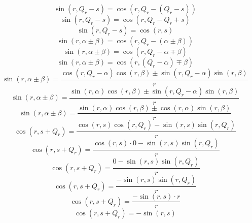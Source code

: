 \documentclass[a4paper,12pt]{report}
\begin{document}
\begin{equation}
\sin(r,Q_r - s) = \cos(r,Q_r - (Q_r - s))
\end{equation}
\begin{equation}
\sin(r,Q_r - s) = \cos(r,Q_r - Q_r + s)
\end{equation}
\begin{equation}
\sin(r,Q_r - s) = \cos(r,s)
\end{equation}
\begin{equation}
\sin(r,\alpha \pm \beta) = \cos(r,Q_r - (\alpha \pm \beta))
\end{equation}
\begin{equation}
\sin(r,\alpha \pm \beta) = \cos(r,Q_r - \alpha \mp \beta)
\end{equation}
\begin{equation}
\sin(r,\alpha \pm \beta) = \cos(r,(Q_r - \alpha) \mp \beta)
\end{equation}
\begin{equation}
\sin(r,\alpha \pm \beta) = \frac{\cos(r,Q_r - \alpha) \cos(r,\beta) \pm \sin(r,Q_r - \alpha) \sin(r,\beta)}{r}
\end{equation}
\begin{equation}
\sin(r,\alpha \pm \beta) = \frac{\sin(r,\alpha) \cos(r,\beta) \pm \sin(r,Q_r - \alpha) \sin(r,\beta)}{r}
\end{equation}
\begin{equation}
\sin(r,\alpha \pm \beta) = \frac{\sin(r,\alpha) \cos(r,\beta) \pm \cos(r,\alpha) \sin(r,\beta)}{r}
\end{equation}
\begin{equation}
\cos(r,s + Q_r) = \frac{\cos(r,s) \cos(r,Q_r) - \sin(r,s) \sin(r,Q_r)}{r}
\end{equation}
\begin{equation}
\cos(r,s + Q_r) = \frac{\cos(r,s) \cdot 0 - \sin(r,s) \sin(r,Q_r)}{r}
\end{equation}
\begin{equation}
\cos(r,s + Q_r) = \frac{0 - \sin(r,s) \sin(r,Q_r)}{r}
\end{equation}
\begin{equation}
\cos(r,s + Q_r) = \frac{-\sin(r,s) \sin(r,Q_r)}{r}
\end{equation}
\begin{equation}
\cos(r,s + Q_r) = \frac{-\sin(r,s) \cdot r}{r}
\end{equation}
\begin{equation}
\cos(r,s + Q_r) = -\sin(r,s)
\end{equation}
\end{document}
